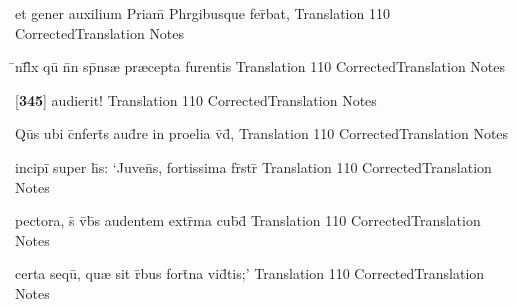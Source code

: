 \latline
  {et gener auxilium Priam\={} Phrgibusque fer\={}bat,}
  { Translation }
  {110}
  { CorrectedTranslation }
  { Notes }


\latline
  {\={\macron {\i}}nf\={}l\={\macron {\i}}x qu\={\macron {\i}} n\={}n sp\={}ns{\ae} pr{\ae}cepta furentis}
  { Translation }
  {110}
  { CorrectedTranslation }
  { Notes }


\latline
  {[\textbf{345}] audierit!}
  { Translation }
  {110}
  { CorrectedTranslation }
  { Notes }


\latline
  {Qu\={}s ubi c\={}nfert\={}s aud\={}re in proelia v\={\macron {\i}}d\={\macron {\i}},}
  { Translation }
  {110}
  { CorrectedTranslation }
  { Notes }


\latline
  {incipi\={} super h\={\macron {\i}}s: `Juven\={}s, fortissima fr\={}str\={}}
  { Translation }
  {110}
  { CorrectedTranslation }
  { Notes }


\latline
  {pectora, s\={\macron {\i}} v\={}b\={\macron {\i}}s audentem extr\={}ma cub\={\macron {\i}}d\={}}
  { Translation }
  {110}
  { CorrectedTranslation }
  { Notes }


\latline
  {certa sequ\={\macron {\i}}, qu{\ae} sit r\={}bus fort\={}na vid\={}tis;'}
  { Translation }
  {110}
  { CorrectedTranslation }
  { Notes }


